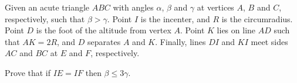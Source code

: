 Given an acute triangle $ABC$ with angles $\alpha$, $\beta$ and $\gamma$ at vertices $A$, $B$ and $C$, respectively, such that $\beta > \gamma$. Point $I$ is the incenter, and $R$ is the circumradius. Point $D$ is the foot of the altitude from vertex $A$. Point $K$ lies on line $AD$ such that $AK = 2R$, and $D$ separates $A$ and $K$. Finally, lines $DI$ and $KI$ meet sides $AC$ and $BC$ at $E$ and $F$, respectively.

Prove that if $IE = IF$ then $\beta \leq 3\gamma$.
